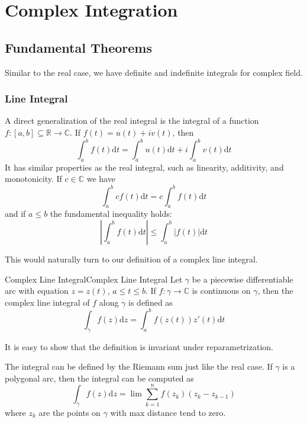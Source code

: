\documentclass[../main.tex]{subfiles}
\begin{document}
\chapter{Complex Integration}

\section{Fundamental Theorems}
Similar to the real case, we have definite and indefinite integrals for complex field.

\subsection{Line Integral}
A direct generalization of the real integral is the integral of a function $f: [a,b] \subseteq \mathbb{R} \rightarrow \mathbb{C}$. If $f(t) = u(t)+iv(t)$, then
\begin{equation}
	\int_a^b f(t) \mathrm{d} t = \int_a^b u(t) \mathrm{d} t + i \int_a^b v(t) \mathrm{d} t
\end{equation}
It has similar properties as the real integral, such as linearity, additivity, and monotonicity. If $c\in \mathbb{C}$ we have
\begin{equation*}
	\int_a^b c f(t) \mathrm{d} t = c \int_a^b f(t) \mathrm{d} t
\end{equation*}
and if $a \leq b$ the fundamental inequality holds:
\begin{equation*}
	\left| \int_a^b f(t) \mathrm{d} t \right| \leq \int_a^b |f(t)| \mathrm{d} t
\end{equation*}

This would naturally turn to our definition of a complex line integral.

\begin{definition}{Complex Line Integral}{Complex Line Integral}
	Let $\gamma$ be a piecewise differentiable arc with equation $z=z(t)$, $a\leq t\leq b$. If $f: \gamma \rightarrow \mathbb{C}$ is continuous on $\gamma$, then the complex line integral of $f$ along $\gamma$ is defined as
	\begin{equation}
		\int_{\gamma} f(z) \mathrm{d} z = \int_a^b f(z(t)) z'(t) \mathrm{d} t
	\end{equation}
\end{definition}
It is easy to show that the definition is invariant under reparametrization.

\begin{remark}
The integral can be defined by the Riemann sum just like the real case. If $\gamma$ is a polygonal arc, then the integral can be computed as
\begin{equation}
	\int_{\gamma} f(z) \mathrm{d} z =\lim \sum_{k=1}^n f(z_k) (z_k - z_{k-1})
\end{equation}
where $z_k$ are the points on $\gamma$ with max distance tend to zero.
\end{remark}
\end{document}

